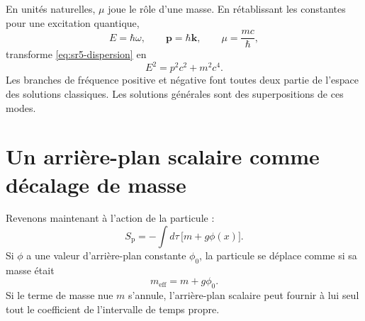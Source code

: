 En unités naturelles, \(\mu\) joue le rôle d’une masse. En rétablissant les constantes pour une excitation quantique, \begin{equation}
E=\hbar\omega,
\qquad
\mathbf{p}=\hbar\mathbf{k},
\qquad
\mu=\frac{mc}{\hbar},
\end{equation}transforme \eqref{eq:sr5-dispersion} en \begin{equation}
E^2=p^2c^2+m^2c^4.
\end{equation}Les branches de fréquence positive et négative font toutes deux partie de l’espace des solutions classiques. Les solutions générales sont des superpositions de ces modes.

\begin{classroomqa}\end{classroomqa}

\begin{classroomqa}\end{classroomqa}

\section{Un arrière-plan scalaire comme décalage de masse}

Revenons maintenant à l’action de la particule : \begin{equation}
S_{\mathrm p}
=
-\int d\tau\,
\bigl[m+g\phi(x)\bigr].
\label{eq:sr5-final-particle-action}
\end{equation}Si \(\phi\) a une valeur d’arrière-plan constante \(\phi_0\), la particule se déplace comme si sa masse était \begin{equation}
\boxed{
m_{\mathrm{eff}}=m+g\phi_0
}.
\label{eq:sr5-effective-mass}
\end{equation}Si le terme de masse nue \(m\) s’annule, l’arrière-plan scalaire peut fournir à lui seul tout le coefficient de l’intervalle de temps propre.

